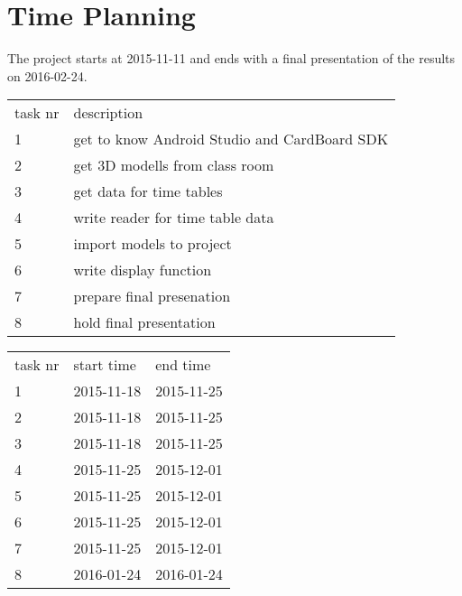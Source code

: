 \documentclass[]{report}
\begin{document}
\section{Time Planning}
The project starts at 2015-11-11 and ends with a final presentation of the results on 2016-02-24. 
\newline
\newline
\begin{tabular}{ l l }
  task nr & description \\
  1 & get to know Android Studio and CardBoard SDK \\
  2 & get 3D modells from class room \\
  3 & get data for time tables \\
  4 & write reader for time table data\\
  5 & import models to project \\
  6 & write display function\\
  7 & prepare final presenation \\
  8 & hold final presentation \\
\end{tabular}
\newline
\begin{tabular}{ l l l}
  task nr & start time & end time\\
  1  & 2015-11-18 & 2015-11-25 \\
  2  & 2015-11-18 & 2015-11-25 \\
  3  & 2015-11-18 & 2015-11-25 \\
  4  & 2015-11-25 & 2015-12-01 \\
  5  & 2015-11-25 & 2015-12-01 \\
  6  & 2015-11-25 & 2015-12-01 \\
  7  & 2015-11-25 & 2015-12-01 \\
  8  & 2016-01-24 & 2016-01-24 \\
\end{tabular}
\end{document}
